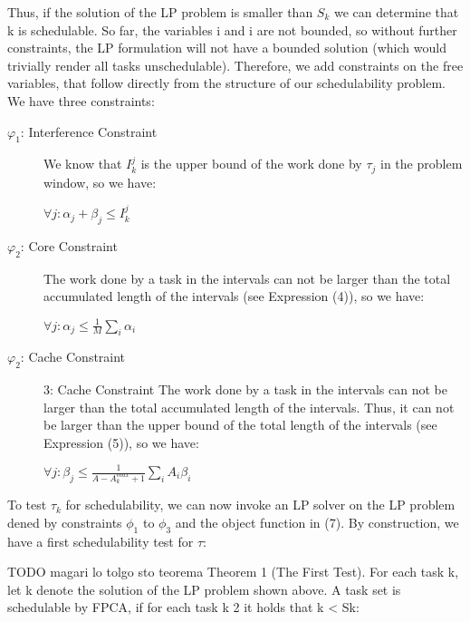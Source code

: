 \documentclass[a4paper,10pt]{article}
\begin{document}
\begin{multicols}{2}
Thus, if the solution of the LP problem is smaller than $S_{k}$ we can determine that k is schedulable.
So far, the variables i and i are not bounded, so without further constraints, the LP formulation will not have a bounded solution (which 
would trivially render all tasks unschedulable). Therefore, we add constraints on the free variables, that follow directly from the structure 
of our schedulability problem. We have three constraints:

\begin{description}
\item[$\varphi_{1}$: Interference Constraint] We know that $I_{k}^j$ is the upper bound of the work done by $\tau_{j}$ in the problem 
window, so we have:
\begin{center} $\forall j: \alpha_{j} + \beta_{j} \le I_{k}^j$ \end{center}

\item[$\varphi_{2}$: Core Constraint] The work done by a task in the intervals can not be larger than the total accumulated length of the intervals
(see Expression (4)), so we have: 
\begin{center} $\forall j: \alpha_{j} \le \frac{1}{M} \sum_{i} \alpha_i$ \end{center}

\item[$\varphi_{2}$: Cache Constraint] 3: Cache Constraint The work done by a task in the intervals can not be larger than the total accumulated
length of the intervals. Thus, it can not be larger than the upper bound of the total length of the intervals (see Expression (5)), so we have:

\begin{center} $\forall j: \beta_{j} \le \frac{1}{A - A_{k}^{max} + 1} \sum_{i}A_{i}\beta_{i}$ \end{center}

\end{description}

To test $\tau_{k}$ for schedulability, we can now invoke an LP solver on the LP problem dened by constraints $\phi_{1}$ to $\phi_{3}$ and the 
object function in (7). By construction, we have a first schedulability test for $\tau$:

TODO magari lo tolgo sto teorema 
Theorem 1 (The First Test). For each task k, let
k denote the solution of the LP problem shown above. A 
task set is schedulable by FPCA, if for each task k 2 it 
holds that
k < Sk:




\end{multicols}
\end{document}
